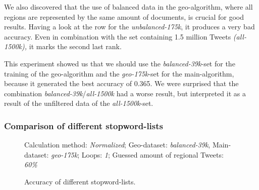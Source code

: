 \documentclass[./Main.tex]{subfiles}
\begin{document}
We also discovered that the use of balanced data in the geo-algorithm, where all regions are represented by the same amount of documents, is crucial for good results. Having a look at the row for the \emph{unbalanced-175k}, it produces a very bad accuracy. Even in combination with the set containing 1.5 million Tweets \emph{(all-1500k),} it marks the second last rank.

This experiment showed us that we should use the \emph{balanced-39k}-set for the training of the geo-algorithm and the \emph{geo-175k}-set for the main-algorithm, because it generated the best accuracy of 0.365. We were surprised that the combination \emph{balanced-39k}/\emph{all-1500k} had a worse result, but interpreted it as a result of the unfiltered data of the \emph{all-1500k}-set.

\subsubsection{Comparison of different stopword-lists}
\begin{figure}[!b]
\begin{center}
\end{center}

Calculation method: \textit{Normalized}; Geo-dataset: \textit{balanced-39k}, Main-dataset: \textit{geo-175k}; Loops: \textit{1}; Guessed amount of regional Tweets: \textit{60\%}
  \label{geo_graph1}
  \caption{Accuracy of different stopword-lists.}
  \label{geo_graph1}

\end{figure}
\end{document}
